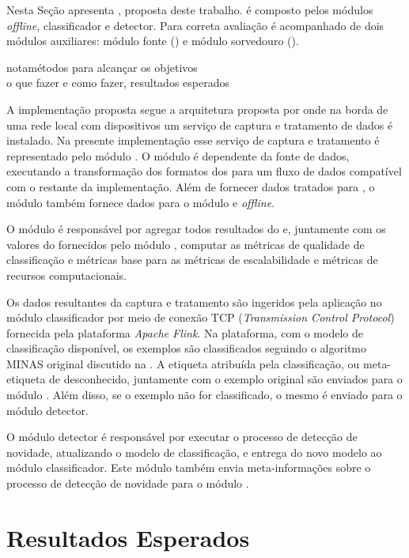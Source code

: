 \newcommand{\offline}{\emph{offline}\xspace}
\newcommand{\classify}{classificador\xspace}
\newcommand{\detector}{detector\xspace}

Nesta Seção apresenta \mfog, proposta deste trabalho.
\mfog é composto pelos módulos \offline, \classify e \detector.
Para correta avaliação \mfog é acompanhado de dois módulos auxiliares:
módulo fonte (\source) e módulo sorvedouro (\sink).

nota{métodos para alcançar os objetivos \\
o que fazer e como fazer, resultados esperados}

A implementação proposta segue a arquitetura proposta por
 onde na borda de uma rede local com dispositivos \iot
um serviço de captura e tratamento de dados é instalado.
Na presente implementação esse serviço de captura e tratamento é representado
pelo módulo \source.
O módulo \source é dependente da fonte de dados, executando a transformação dos
formatos dos \datasets para um fluxo de dados compatível com o restante da
implementação.
Além de fornecer dados tratados para \mfog, o módulo \source também fornece
dados para o módulo \sink e \offline.

O módulo \sink é responsável por agregar todos resultados do \mfog e, juntamente
com os valores do \dataset fornecidos pelo módulo \source, computar as métricas
de qualidade de classificação e métricas base para as métricas de
escalabilidade e métricas de recursos computacionais.

\newcommand{\flink}{\emph{Apache Flink}\xspace}

Os dados resultantes da captura e tratamento são ingeridos pela aplicação no
módulo \classify por meio de conexão TCP (\emph{Transmission Control Protocol})
fornecida pela plataforma \flink.
Na plataforma, com o modelo de classificação disponível, os exemplos são
classificados seguindo o algoritmo MINAS original discutido na .
A etiqueta atribuída pela classificação, ou meta-etiqueta de desconhecido,
juntamente com o exemplo original são enviados para o módulo \sink.
Além disso, se o exemplo não for classificado, o mesmo é enviado para o módulo
\detector.

O módulo \detector é responsável por executar o processo de detecção de
novidade, atualizando o modelo de classificação, e entrega do novo modelo
ao módulo \classify.
Este módulo também envia meta-informações sobre o processo de detecção de
novidade para o módulo \sink.

\section{Resultados Esperados}\label{sec:esperados}

